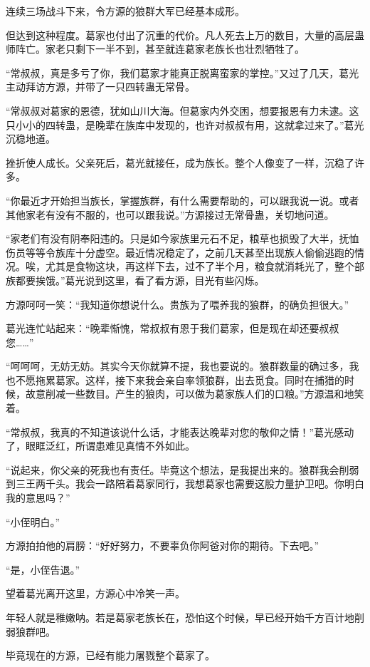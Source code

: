 \begin{this_body}
连续三场战斗下来，令方源的狼群大军已经基本成形。

但达到这种程度。葛家也付出了沉重的代价。凡人死去上万的数目，大量的高层蛊师阵亡。家老只剩下一半不到，甚至就连葛家老族长也壮烈牺牲了。

“常叔叔，真是多亏了你，我们葛家才能真正脱离蛮家的掌控。”又过了几天，葛光主动拜访方源，并带了一只四转蛊无常骨。

“常叔叔对葛家的恩德，犹如山川大海。但葛家内外交困，想要报恩有力未逮。这只小小的四转蛊，是晚辈在族库中发现的，也许对叔叔有用，这就拿过来了。”葛光沉稳地道。

挫折使人成长。父亲死后，葛光就接任，成为族长。整个人像变了一样，沉稳了许多。

“你最近才开始担当族长，掌握族群，有什么需要帮助的，可以跟我说一说。或者其他家老有没有不服的，也可以跟我说。”方源接过无常骨蛊，关切地问道。

“家老们有没有阴奉阳违的。只是如今家族里元石不足，粮草也损毁了大半，抚恤伤员等等令族库十分虚空。最近情况稳定了，之前几天甚至出现族人偷偷逃跑的情况。唉，尤其是食物这块，再这样下去，过不了半个月，粮食就消耗光了，整个部族都要挨饿。”葛光说到这里，看了看方源，目光有些闪烁。

方源呵呵一笑：“我知道你想说什么。贵族为了喂养我的狼群，的确负担很大。”

葛光连忙站起来：“晚辈惭愧，常叔叔有恩于我们葛家，但是现在却还要叔叔您……”

“呵呵呵，无妨无妨。其实今天你就算不提，我也要说的。狼群数量的确过多，我也不愿拖累葛家。这样，接下来我会亲自率领狼群，出去觅食。同时在捕猎的时候，故意削减一些数目。产生的狼肉，可以做为葛家族人们的口粮。”方源温和地笑着。

“常叔叔，我真的不知道该说什么话，才能表达晚辈对您的敬仰之情！”葛光感动了，眼眶泛红，所谓患难见真情不外如此。

“说起来，你父亲的死我也有责任。毕竟这个想法，是我提出来的。狼群我会削弱到三王两千头。我会一路陪着葛家同行，我想葛家也需要这股力量护卫吧。你明白我的意思吗？”

“小侄明白。”

方源拍拍他的肩膀：“好好努力，不要辜负你阿爸对你的期待。下去吧。”

“是，小侄告退。”

望着葛光离开这里，方源心中冷笑一声。

年轻人就是稚嫩呐。若是葛家老族长在，恐怕这个时候，早已经开始千方百计地削弱狼群吧。

毕竟现在的方源，已经有能力屠戮整个葛家了。

\end{this_body}

